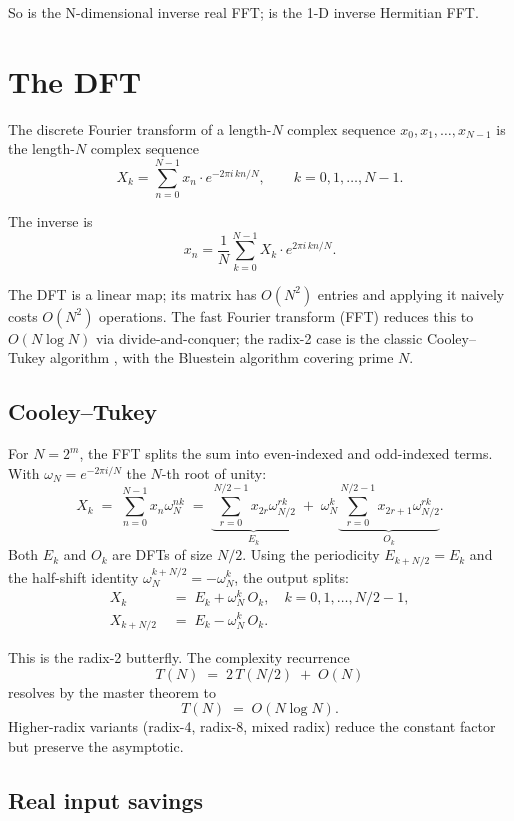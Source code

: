 So  is the N-dimensional inverse real FFT;
 is the 1-D inverse Hermitian FFT.

\section{The DFT}
\label{sec:fft:dft}

The discrete Fourier transform of a length-$N$ complex sequence
$x_0, x_1, \ldots, x_{N-1}$ is the length-$N$ complex sequence
\[
X_k = \sum_{n=0}^{N-1} x_n \cdot e^{-2\pi i \, k n / N},
\qquad k = 0, 1, \ldots, N-1.
\]

The inverse is
\[
x_n = \frac{1}{N} \sum_{k=0}^{N-1} X_k \cdot e^{2\pi i \, k n /
N}.
\]

The DFT is a linear map; its matrix has $O(N^2)$ entries and
applying it naively costs $O(N^2)$ operations. The fast Fourier
transform (FFT) reduces this to $O(N \log N)$ via
divide-and-conquer; the radix-2 case is the classic Cooley--Tukey
algorithm \cite{cooley_tukey_1965}, with the Bluestein algorithm
covering prime $N$.

\subsection{Cooley--Tukey}
\label{ssec:fft:cooley_tukey}

For $N = 2^m$, the FFT splits the sum into even-indexed and
odd-indexed terms. With $\omega_N = e^{-2\pi i / N}$ the $N$-th
root of unity:
\[
X_k \;=\; \sum_{n=0}^{N-1} x_n \omega_N^{nk}
       \;=\; \underbrace{\sum_{r=0}^{N/2-1} x_{2r} \omega_{N/2}^{rk}}_{E_k}
       \;+\; \omega_N^{k} \underbrace{\sum_{r=0}^{N/2-1} x_{2r+1} \omega_{N/2}^{rk}}_{O_k}.
\]
Both $E_k$ and $O_k$ are DFTs of size $N/2$. Using the periodicity
$E_{k+N/2} = E_k$ and the half-shift identity
$\omega_N^{k+N/2} = -\omega_N^k$, the output splits:
\begin{align*}
X_k       &\;=\; E_k + \omega_N^k\, O_k,        \quad k = 0, 1, \ldots, N/2-1, \\
X_{k+N/2} &\;=\; E_k - \omega_N^k\, O_k.
\end{align*}

This is the radix-2 butterfly. The complexity recurrence
\[
T(N) \;=\; 2\,T(N/2) \;+\; O(N)
\]
resolves by the master theorem to
\[
T(N) \;=\; O(N \log N).
\]
Higher-radix variants (radix-4, radix-8, mixed radix) reduce the
constant factor but preserve the asymptotic.

\subsection{Real input savings}
\label{ssec:fft:real_savings}

